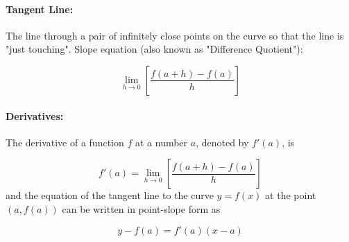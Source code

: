 \documentclass[12pt]{article}
\begin{document}
\paragraph{Tangent Line:} The line through a pair of infinitely close points on the curve so that the line is "just touching". Slope equation (also known as "Difference Quotient"):

$$\lim_{h \to 0} \left [ \frac{f(a+h)-f(a)}{h} \right ]$$

\paragraph{Derivatives:} The derivative of a function $f$ at a number $a$, denoted by $f'(a)$, is 

$$f'(a) = \lim_{h \to 0} \left [ \frac{f(a+h)-f(a)}{h} \right ]$$
and the equation of the tangent line to the curve $y=f(x)$ at the point $(a,f(a))$ can be written in point-slope form as

$$y-f(a)=f'(a)(x-a)$$
\end{document}
